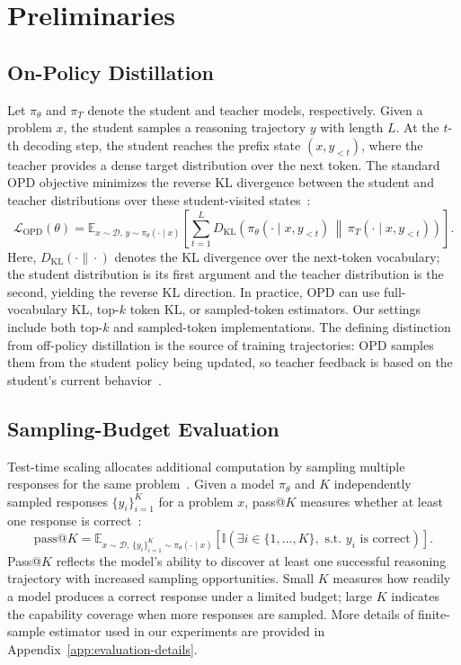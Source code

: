 \documentclass{article}
\theoremstyle{opdplain}
\begin{document}
\section{Preliminaries}
\label{sec:preliminaries}

\subsection{On-Policy Distillation}
Let $\pi_\theta$ and $\pi_T$ denote the student and teacher models, respectively.
Given a problem $x$, the student samples a reasoning trajectory $y$ with length
$L$.
At the $t$-th decoding step, the student reaches the prefix state $(x,y_{<t})$, where the teacher provides a dense target distribution over the next token.
The standard OPD objective minimizes the reverse KL divergence between the student and teacher distributions over these student-visited states~\citep{li2026rethinkingopd,gu2024minillm}:
\begin{equation}
    \mathcal{L}_{\mathrm{OPD}}(\theta)
    =
    \mathbb{E}_{x\sim\mathcal{D},\,
    y\sim\pi_\theta(\cdot\mid x)}
    \left[
    \sum_{t=1}^{L}
    D_{\mathrm{KL}}\!\left(
    \pi_\theta(\cdot\mid x,y_{<t})
    \,\middle\|\,
    \pi_T(\cdot\mid x,y_{<t})
    \right)
    \right].
\end{equation}
Here, $D_{\mathrm{KL}}(\cdot\|\cdot)$ denotes the KL divergence over the next-token vocabulary; the student distribution is its first argument and the teacher distribution is the second, yielding the reverse KL direction.
In practice, OPD can use full-vocabulary KL, top-$k$ token KL, or sampled-token estimators.
Our settings include both top-$k$ and sampled-token implementations.
The defining distinction from off-policy distillation is the source of training trajectories: OPD samples them from the student policy being updated, so teacher feedback is based on the student's current behavior~\citep{agarwal2024onpolicy}.

\subsection{Sampling-Budget Evaluation}
Test-time scaling allocates additional computation by sampling multiple responses for the same problem~\citep{brown2024large}.
Given a model $\pi_\theta$ and $K$ independently sampled responses $\{y_i\}_{i=1}^{K}$ for a problem $x$, pass@$K$ measures whether at least one response is correct~\citep{chen2021codex}:
\begin{equation}
    \mathrm{pass}@K
    =
    \mathbb{E}_{
    x\sim\mathcal D,\,
    \{y_i\}_{i=1}^{K}\sim\pi_\theta(\cdot\mid x)
    }
    \left[
    \mathbb I\!\left(
    \exists i\in\{1,\ldots,K\},
    \text{ s.t. }y_i\text{ is correct}
    \right)
    \right].
\end{equation}
Pass@$K$ reflects the model's ability to discover at least one successful reasoning trajectory with increased sampling opportunities.
Small $K$ measures how readily a model produces a correct response under a limited budget; large $K$ indicates the capability coverage when more responses are sampled.
More details of finite-sample estimator used in our experiments are provided in Appendix~\ref{app:evaluation-details}.
\end{document}
